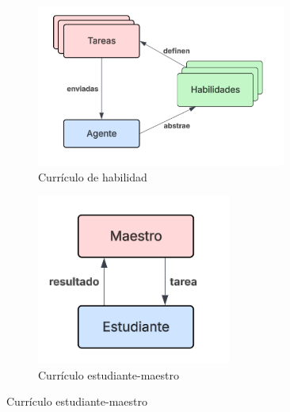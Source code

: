 \begin{figure}[h!]
	\centering
	
	\begin{subfigure}[b]{0.35\textwidth}
		\centering
		\includegraphics[width=0.9\textwidth]{images/marco-teorico/curr-1}
		\caption{Currículo de habilidad}
		\label{fig:curr-1}
	\end{subfigure}
	\hspace{0.05\textwidth}
	\begin{subfigure}[b]{0.35\textwidth}
		\centering
		\includegraphics[width=0.7\textwidth]{images/marco-teorico/curr-2}
		\caption{Currículo estudiante-maestro}
		\label{fig:curr-2}
	\end{subfigure}
	
	\vspace{1em}
	

\end{figure}
